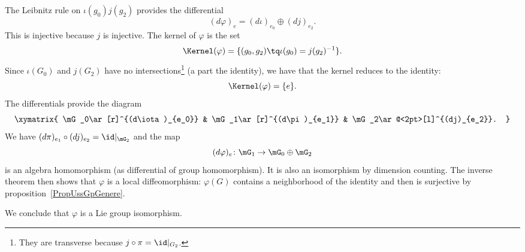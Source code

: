 The Leibnitz rule on $\iota(g_0)j(g_2)$ provides the differential
\begin{equation}
    (d\varphi)_e=(d\iota)_{e_0}\oplus(dj)_{e_2}.
\end{equation}
This is injective because $j$ is injective. The kernel of $\varphi$ is the set
\begin{equation}
    \Kernel(\varphi)=\{ (g_0,g_2)\tq \iota(g_0)=j(g_2)^{-1} \}.
\end{equation}
Since $\iota(G_0)$ and $j(G_2)$ have no intersections\footnote{They are transverse because $j\circ \pi=\id|_{G_2}$.} (a part the identity), we have that the kernel reduces to the identity:
\begin{equation}
    \Kernel(\varphi)=\{ e \}.
\end{equation}
The differentials provide the diagram
\begin{equation}
    \xymatrix{
    \mG_0\ar[r]^{(d\iota)_{e_0}}    &   \mG_1\ar[r]^{(d\pi)_{e_1}}  &   \mG_2\ar@<2pt>[l]^{(dj)_{e_2}}.
    }
\end{equation}
We have $(d\pi)_{e_1}\circ (dj)_{e_2}=\id|_{\mG_2}$ and the map
\begin{equation}
    (d\varphi)_e\colon \mG_1\to \mG_0\oplus\mG_2
\end{equation}
is an algebra homomorphism (as differential of group homomorphism). It is also an isomorphism by dimension counting. The inverse theorem then shows that $\varphi$ is a local diffeomorphism: $\varphi(G)$ contains a neighborhood of the identity and then is surjective by proposition~\ref{PropUssGpGenere}.

We conclude that $\varphi$ is a Lie group isomorphism.

